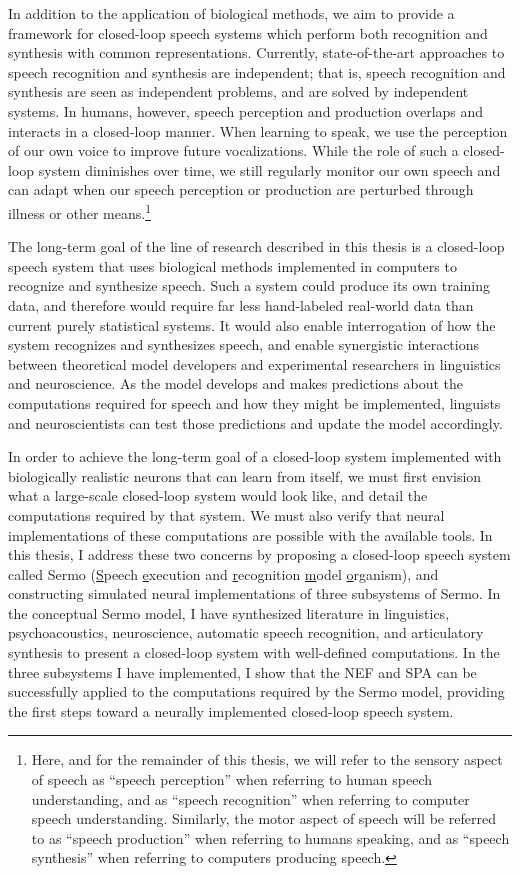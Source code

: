 In addition to the application of biological methods,
we aim to provide a framework for
closed-loop speech systems
which perform both recognition and synthesis
with common representations.
Currently, state-of-the-art approaches
to speech recognition and synthesis
are independent;
that is, speech recognition and synthesis
are seen as independent problems,
and are solved by independent systems.
In humans, however,
speech perception and production
overlaps and interacts in a closed-loop manner.
When learning to speak,
we use the perception of our own voice
to improve future vocalizations.
While the role of such a closed-loop system
diminishes over time,
we still regularly monitor
our own speech and can adapt
when our speech perception or production
are perturbed through illness
or other means.\footnote{
  Here, and for the remainder of this thesis,
  we will refer to the sensory aspect
  of speech as ``speech perception''
  when referring to human speech understanding,
  and as ``speech recognition''
  when referring to computer speech understanding.
  Similarly, the motor aspect of speech
  will be referred to as
  ``speech production''
  when referring to humans speaking,
  and as ``speech synthesis''
  when referring to computers producing speech.}

The long-term goal of the line of research
described in this thesis
is a closed-loop speech system
that uses biological methods
implemented in computers
to recognize and synthesize speech.
Such a system could produce its own training data,
and therefore would require
far less hand-labeled real-world data than
current purely statistical systems.
It would also enable interrogation
of how the system recognizes
and synthesizes speech,
and enable synergistic interactions
between theoretical model developers
and experimental researchers
in linguistics and neuroscience.
As the model develops and makes predictions
about the computations required for speech
and how they might be implemented,
linguists and neuroscientists
can test those predictions
and update the model accordingly.

In order to achieve the long-term goal
of a closed-loop system
implemented with biologically realistic neurons
that can learn from itself,
we must first
envision what a large-scale closed-loop system
would look like,
and detail the computations required by that system.
We must also verify that neural implementations
of these computations
are possible with the available tools.
In this thesis, I address these two concerns
by proposing a closed-loop speech system
called Sermo
(\underline{S}peech \underline{e}xecution and
\underline{r}ecognition \underline{m}odel \underline{o}rganism),
and constructing simulated neural implementations
of three subsystems of Sermo.
In the conceptual Sermo model,
I have synthesized literature
in linguistics, psychoacoustics, neuroscience,
automatic speech recognition,
and articulatory synthesis
to present a closed-loop system
with well-defined computations.
In the three subsystems I have implemented,
I show that the NEF and SPA
can be successfully applied to
the computations required by the Sermo model,
providing the first steps
toward a neurally implemented closed-loop speech system.


